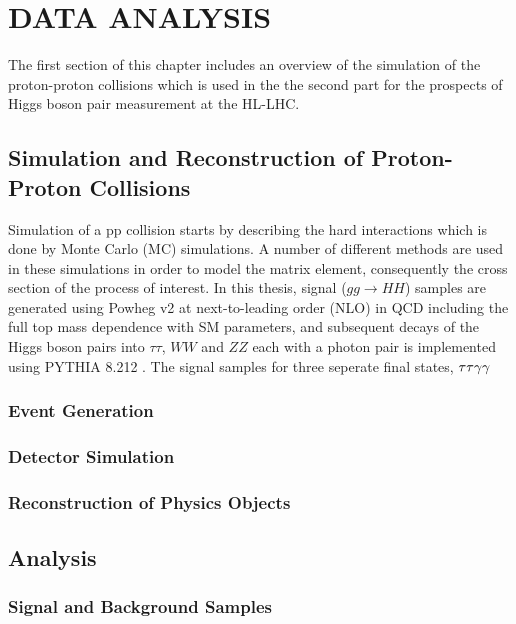 \chapter{DATA ANALYSIS}\label{ch3}

The first section of this chapter includes an overview of the simulation of the proton-proton collisions which is used in the the second part for the prospects of Higgs boson pair measurement at the HL-LHC.

\section{Simulation and Reconstruction of Proton-Proton Collisions}

Simulation of a pp collision starts by describing the hard interactions which is done by Monte Carlo (MC) simulations. A number of different methods are used in these simulations in order to model the matrix element, consequently the cross section of the process of interest. In this thesis, signal ($gg \rightarrow HH$) samples are generated using Powheg v2 \cite{Nason2004, Frixione2007, Alioli2010, Heinrich2019} at next-to-leading order (NLO) in QCD including the full top mass dependence with SM parameters, and subsequent decays of the Higgs boson pairs into $\tau\tau$, $WW$ and $ZZ$ each with a photon pair is implemented using PYTHIA 8.212 \cite{Sjstrand2015}. The signal samples for three seperate final states, $\tau\tau\gamma\gamma$ 

\subsection{Event Generation}

\subsection{Detector Simulation}

\subsection{Reconstruction of Physics Objects}

\section{Analysis}

\subsection{Signal and Background Samples}


